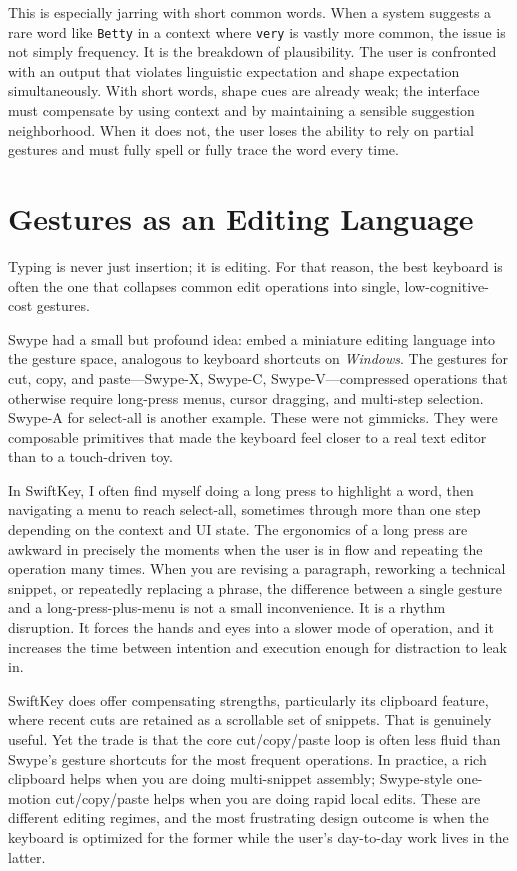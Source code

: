 \documentclass[11pt]{article}
\begin{document}
This is especially jarring with short common words. When a system suggests a rare word like \texttt{Betty} in a context where \texttt{very} is vastly more common, the issue is not simply frequency. It is the breakdown of plausibility. The user is confronted with an output that violates linguistic expectation and shape expectation simultaneously. With short words, shape cues are already weak; the interface must compensate by using context and by maintaining a sensible suggestion neighborhood. When it does not, the user loses the ability to rely on partial gestures and must fully spell or fully trace the word every time.

\section{Gestures as an Editing Language}

Typing is never just insertion; it is editing. For that reason, the best keyboard is often the one that collapses common edit operations into single, low-cognitive-cost gestures.

Swype had a small but profound idea: embed a miniature editing language into the gesture space, analogous to keyboard shortcuts on \textit{Windows}. The gestures for cut, copy, and paste---Swype-X, Swype-C, Swype-V---compressed operations that otherwise require long-press menus, cursor dragging, and multi-step selection. Swype-A for select-all is another example. These were not gimmicks. They were composable primitives that made the keyboard feel closer to a real text editor than to a touch-driven toy.

In SwiftKey, I often find myself doing a long press to highlight a word, then navigating a menu to reach select-all, sometimes through more than one step depending on the context and UI state. The ergonomics of a long press are awkward in precisely the moments when the user is in flow and repeating the operation many times. When you are revising a paragraph, reworking a technical snippet, or repeatedly replacing a phrase, the difference between a single gesture and a long-press-plus-menu is not a small inconvenience. It is a rhythm disruption. It forces the hands and eyes into a slower mode of operation, and it increases the time between intention and execution enough for distraction to leak in.

SwiftKey does offer compensating strengths, particularly its clipboard feature, where recent cuts are retained as a scrollable set of snippets. That is genuinely useful. Yet the trade is that the core cut/copy/paste loop is often less fluid than Swype's gesture shortcuts for the most frequent operations. In practice, a rich clipboard helps when you are doing multi-snippet assembly; Swype-style one-motion cut/copy/paste helps when you are doing rapid local edits. These are different editing regimes, and the most frustrating design outcome is when the keyboard is optimized for the former while the user's day-to-day work lives in the latter.
\end{document}
